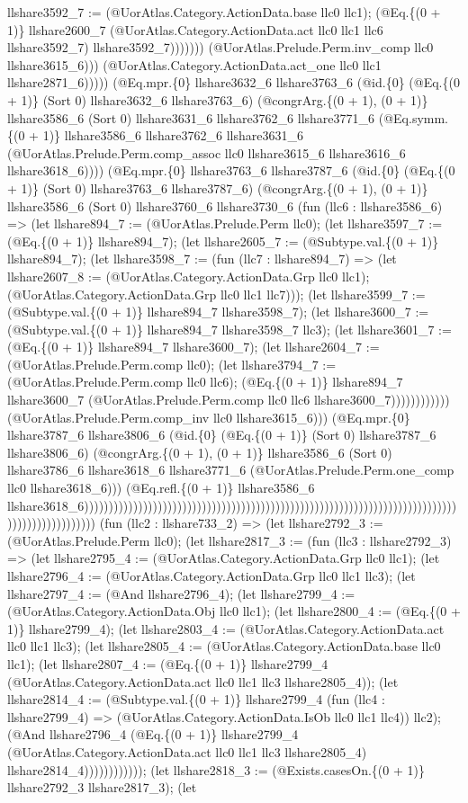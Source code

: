 \documentclass[11pt]{article}
\begin{document}
llshare3592\_7 := (@UorAtlas.Category.ActionData.base llc0 llc1); (@Eq.\{(0 + 1)\} llshare2600\_7 (@UorAtlas.Category.ActionData.act llc0 llc1 llc6 llshare3592\_7) llshare3592\_7))))))) (@UorAtlas.Prelude.Perm.inv\_comp llc0 llshare3615\_6))) (@UorAtlas.Category.ActionData.act\_one llc0 llc1 llshare2871\_6))))) (@Eq.mpr.\{0\} llshare3632\_6 llshare3763\_6 (@id.\{0\} (@Eq.\{(0 + 1)\} (Sort 0) llshare3632\_6 llshare3763\_6) (@congrArg.\{(0 + 1), (0 + 1)\} llshare3586\_6 (Sort 0) llshare3631\_6 llshare3762\_6 llshare3771\_6 (@Eq.symm.\{(0 + 1)\} llshare3586\_6 llshare3762\_6 llshare3631\_6 (@UorAtlas.Prelude.Perm.comp\_assoc llc0 llshare3615\_6 llshare3616\_6 llshare3618\_6)))) (@Eq.mpr.\{0\} llshare3763\_6 llshare3787\_6 (@id.\{0\} (@Eq.\{(0 + 1)\} (Sort 0) llshare3763\_6 llshare3787\_6) (@congrArg.\{(0 + 1), (0 + 1)\} llshare3586\_6 (Sort 0) llshare3760\_6 llshare3730\_6 (fun (llc6 : llshare3586\_6) => (let llshare894\_7 := (@UorAtlas.Prelude.Perm llc0); (let llshare3597\_7 := (@Eq.\{(0 + 1)\} llshare894\_7); (let llshare2605\_7 := (@Subtype.val.\{(0 + 1)\} llshare894\_7); (let llshare3598\_7 := (fun (llc7 : llshare894\_7) => (let llshare2607\_8 := (@UorAtlas.Category.ActionData.Grp llc0 llc1); (@UorAtlas.Category.ActionData.Grp llc0 llc1 llc7))); (let llshare3599\_7 := (@Subtype.val.\{(0 + 1)\} llshare894\_7 llshare3598\_7); (let llshare3600\_7 := (@Subtype.val.\{(0 + 1)\} llshare894\_7 llshare3598\_7 llc3); (let llshare3601\_7 := (@Eq.\{(0 + 1)\} llshare894\_7 llshare3600\_7); (let llshare2604\_7 := (@UorAtlas.Prelude.Perm.comp llc0); (let llshare3794\_7 := (@UorAtlas.Prelude.Perm.comp llc0 llc6); (@Eq.\{(0 + 1)\} llshare894\_7 llshare3600\_7 (@UorAtlas.Prelude.Perm.comp llc0 llc6 llshare3600\_7)))))))))))) (@UorAtlas.Prelude.Perm.comp\_inv llc0 llshare3615\_6))) (@Eq.mpr.\{0\} llshare3787\_6 llshare3806\_6 (@id.\{0\} (@Eq.\{(0 + 1)\} (Sort 0) llshare3787\_6 llshare3806\_6) (@congrArg.\{(0 + 1), (0 + 1)\} llshare3586\_6 (Sort 0) llshare3786\_6 llshare3618\_6 llshare3771\_6 (@UorAtlas.Prelude.Perm.one\_comp llc0 llshare3618\_6))) (@Eq.refl.\{(0 + 1)\} llshare3586\_6 llshare3618\_6)))))))))))))))))))))))))))))))))))))))))))))))))))))))))))))))))))))))))))))))))))))))))))))) (fun (llc2 : llshare733\_2) => (let llshare2792\_3 := (@UorAtlas.Prelude.Perm llc0); (let llshare2817\_3 := (fun (llc3 : llshare2792\_3) => (let llshare2795\_4 := (@UorAtlas.Category.ActionData.Grp llc0 llc1); (let llshare2796\_4 := (@UorAtlas.Category.ActionData.Grp llc0 llc1 llc3); (let llshare2797\_4 := (@And llshare2796\_4); (let llshare2799\_4 := (@UorAtlas.Category.ActionData.Obj llc0 llc1); (let llshare2800\_4 := (@Eq.\{(0 + 1)\} llshare2799\_4); (let llshare2803\_4 := (@UorAtlas.Category.ActionData.act llc0 llc1 llc3); (let llshare2805\_4 := (@UorAtlas.Category.ActionData.base llc0 llc1); (let llshare2807\_4 := (@Eq.\{(0 + 1)\} llshare2799\_4 (@UorAtlas.Category.ActionData.act llc0 llc1 llc3 llshare2805\_4)); (let llshare2814\_4 := (@Subtype.val.\{(0 + 1)\} llshare2799\_4 (fun (llc4 : llshare2799\_4) => (@UorAtlas.Category.ActionData.IsOb llc0 llc1 llc4)) llc2); (@And llshare2796\_4 (@Eq.\{(0 + 1)\} llshare2799\_4 (@UorAtlas.Category.ActionData.act llc0 llc1 llc3 llshare2805\_4) llshare2814\_4)))))))))))); (let llshare2818\_3 := (@Exists.casesOn.\{(0 + 1)\} llshare2792\_3 llshare2817\_3); (let 
\end{document}
